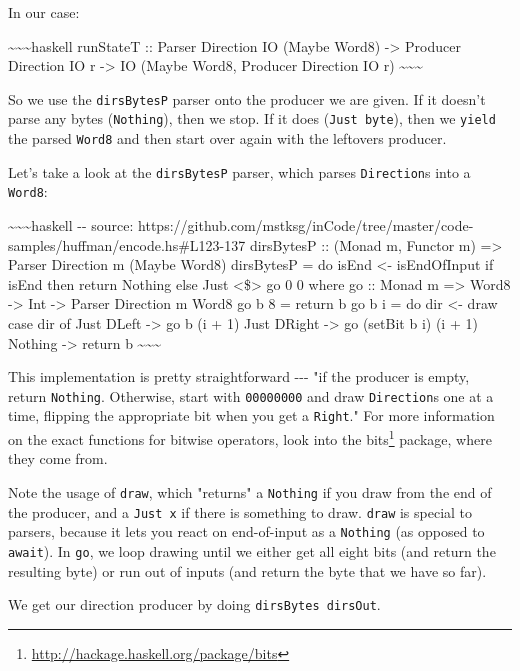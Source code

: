 \documentclass[]{article}
\renewcommand{\href}[2]{#2\footnote{\url{#1}}}
\begin{document}
In our case:

\textasciitilde{}\textasciitilde{}\textasciitilde{}haskell runStateT :: Parser
Direction IO (Maybe Word8) -\textgreater{} Producer Direction IO r
-\textgreater{} IO (Maybe Word8, Producer Direction IO r)
\textasciitilde{}\textasciitilde{}\textasciitilde{}

So we use the \texttt{dirsBytesP} parser onto the producer we are given. If it
doesn't parse any bytes (\texttt{Nothing}), then we stop. If it does
(\texttt{Just\ byte}), then we \texttt{yield} the parsed \texttt{Word8} and then
start over again with the leftovers producer.

Let's take a look at the \texttt{dirsBytesP} parser, which parses
\texttt{Direction}s into a \texttt{Word8}:

\textasciitilde{}\textasciitilde{}\textasciitilde{}haskell -\/- source:
https://github.com/mstksg/inCode/tree/master/code-samples/huffman/encode.hs\#L123-137
dirsBytesP :: (Monad m, Functor m) =\textgreater{} Parser Direction m (Maybe
Word8) dirsBytesP = do isEnd \textless{}- isEndOfInput if isEnd then return
Nothing else Just \textless{}\$\textgreater{} go 0 0 where go :: Monad m
=\textgreater{} Word8 -\textgreater{} Int -\textgreater{} Parser Direction m
Word8 go b 8 = return b go b i = do dir \textless{}- draw case dir of Just DLeft
-\textgreater{} go b (i + 1) Just DRight -\textgreater{} go (setBit b i) (i + 1)
Nothing -\textgreater{} return b
\textasciitilde{}\textasciitilde{}\textasciitilde{}

This implementation is pretty straightforward -\/-\/- "if the producer is empty,
return \texttt{Nothing}. Otherwise, start with \texttt{00000000} and draw
\texttt{Direction}s one at a time, flipping the appropriate bit when you get a
\texttt{Right}." For more information on the exact functions for bitwise
operators, look into the \href{http://hackage.haskell.org/package/bits}{bits}
package, where they come from.

Note the usage of \texttt{draw}, which "returns" a \texttt{Nothing} if you draw
from the end of the producer, and a \texttt{Just\ x} if there is something to
draw. \texttt{draw} is special to parsers, because it lets you react on
end-of-input as a \texttt{Nothing} (as opposed to \texttt{await}). In
\texttt{go}, we loop drawing until we either get all eight bits (and return the
resulting byte) or run out of inputs (and return the byte that we have so far).

We get our direction producer by doing \texttt{dirsBytes\ dirsOut}.
\end{document}

